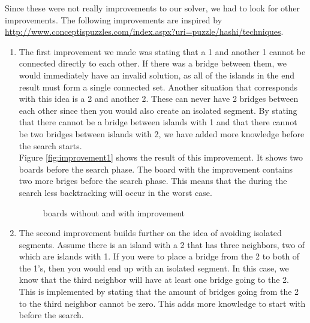 \documentclass{report}
\begin{document}
Since these were not really improvements to our solver, we had to look for other improvements. The following improvements are inspired by \url{http://www.conceptispuzzles.com/index.aspx?uri=puzzle/hashi/techniques}.

\begin{enumerate}
	\item The first improvement we made was stating that a 1 and another 1 cannot be connected directly to each other. If there was a bridge between them, we would immediately have an invalid solution, as all of the islands in the end result must form a single connected set. Another situation that corresponds with this idea is a 2 and another 2. These can never have 2 bridges between each other since then you would also create an isolated segment. By stating that there cannot be a bridge between islands with 1 and that there cannot be two bridges between islands with 2, we have added more knowledge before the search starts. \\
	Figure \ref{fig:improvement1} shows the result of this improvement. It shows two boards before the search phase. The board with the improvement contains two more briges before the search phase. This means that the during the search less backtracking will occur in the worst case.
	\begin{figure}[h]
    	\label{fig:improvement1}
        \centering
        \qquad
        \caption{boards without and with improvement}%
        \label{fig:classic_heuristic}%
    \end{figure}
    
	\item The second improvement builds further on the idea of avoiding isolated segments. 
	Assume there is an island with a 2 that has three neighbors, two of which are islands with 1. If you were to place a bridge from the 2 to both of the 1's, then you would end up with an isolated segment. In this case, we know that the third neighbor will have at least one bridge going to the 2. This is implemented by stating that the amount of bridges going from the 2 to the third neighbor cannot be zero. This adds more knowledge to start with before the search.
	

\end{enumerate}
\end{document}

